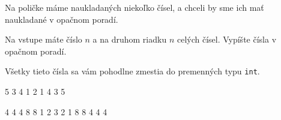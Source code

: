 




Na poličke máme naukladaných niekoľko čísel, a chceli by sme ich mať naukladané v opačnom poradí.


Na vstupe máte číslo $n$ a na druhom riadku $n$ celých čísel.
Vypíšte čísla v opačnom poradí. 

Všetky tieto čísla sa vám pohodlne zmestia do premenných typu \verb!int!.



5 3 4 1 2
 1 4 3 5
\koniec

4 4 4 8 8 1 2 3
 2 1 8 8 4 4 4
\koniec


